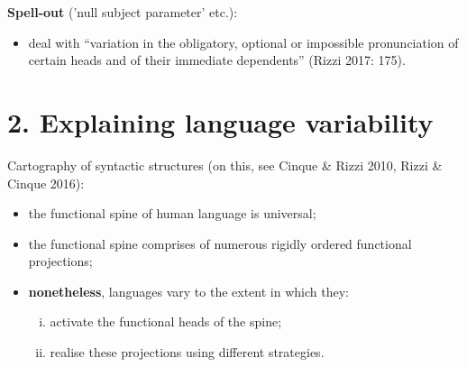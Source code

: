 \documentclass[fleqn,10pt]{wlscirep}
\begin{document}
\noindent\textbf{Spell-out} ('null subject parameter' etc.): 
\begin{itemize}
    \item \vspace*{-2mm} deal with “variation in the obligatory, optional or impossible pronunciation of certain heads and of their immediate dependents” (Rizzi 2017: 175). 
\end{itemize}

\section*{2. Explaining language variability}

Cartography of syntactic structures (on this, see Cinque \& Rizzi 2010, Rizzi \& Cinque 2016):
\begin{itemize}
    \item \vspace*{-2mm} the functional spine of human language is universal;
    \item \vspace*{-2mm} the functional spine comprises of numerous rigidly ordered functional projections;
    \item \vspace*{-2mm} \textbf{nonetheless}, languages vary to the extent in which they:
        \begin{enumerate}[i.]
            \item \vspace*{-2mm} activate the functional heads of the spine;
            \item \vspace*{-2mm} realise these projections using different strategies. 
        \end{enumerate}
\end{itemize}
\end{document}
